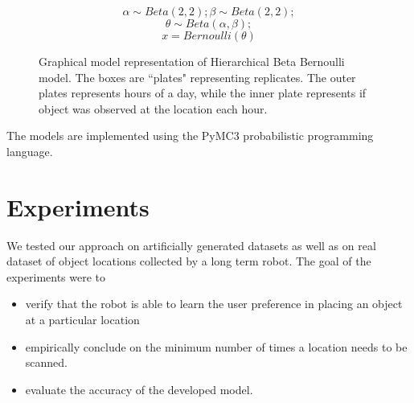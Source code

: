 \noindent
\begin{figure}[htp]

\begin{minipage}{0.3\textwidth}
\centering


\end{minipage}%
\begin{minipage}{0.7\textwidth}

\begin{equation*}
	\alpha \sim Beta(2,2) ; \beta \sim Beta(2, 2);
\end{equation*}
\begin{equation*}
	\theta \sim Beta(\alpha, \beta);
\end{equation*}
\begin{equation*}
	x = Bernoulli(\theta)
\end{equation*}
\end{minipage}
\caption[Hierarchical Beta Bernoulli graphical model]{Graphical model representation of Hierarchical Beta Bernoulli model. The boxes are ``plates" representing replicates. The outer plates represents hours of a day, while the inner plate represents if object was observed at the location each hour.}
\label{bbm}
\end{figure}

The models are implemented using the PyMC3 probabilistic programming language.

\FloatBarrier
\section{Experiments}

We tested our approach on artificially generated datasets as well as on real dataset of object locations collected by a long term robot.
The goal of the experiments were to
\begin{itemize}
    \item verify that the robot is able to learn the user preference in placing an object at a particular location
	\item empirically conclude on the minimum number of times a location needs to be scanned.
	\item evaluate the accuracy of the developed model.
\end{itemize}

